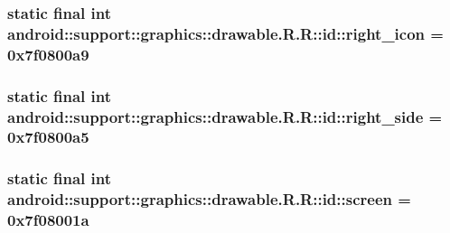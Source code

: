 \hypertarget{classandroid_1_1support_1_1graphics_1_1drawable_1_1_r_1_1id_70ab3cedc2a740c3ae09f3d630d990b9}{
\subsubsection[{right\_\-icon}]{\setlength{\rightskip}{0pt plus 5cm}static final int android::support::graphics::drawable.R.R::id::right\_\-icon = 0x7f0800a9}}
\label{classandroid_1_1support_1_1graphics_1_1drawable_1_1_r_1_1id_70ab3cedc2a740c3ae09f3d630d990b9}


\hypertarget{classandroid_1_1support_1_1graphics_1_1drawable_1_1_r_1_1id_36475d3142060d01b9d547e88a66b2ea}{
\subsubsection[{right\_\-side}]{\setlength{\rightskip}{0pt plus 5cm}static final int android::support::graphics::drawable.R.R::id::right\_\-side = 0x7f0800a5}}
\label{classandroid_1_1support_1_1graphics_1_1drawable_1_1_r_1_1id_36475d3142060d01b9d547e88a66b2ea}


\hypertarget{classandroid_1_1support_1_1graphics_1_1drawable_1_1_r_1_1id_90cb3d85b590166151c799fbe79e411c}{
\subsubsection[{screen}]{\setlength{\rightskip}{0pt plus 5cm}static final int android::support::graphics::drawable.R.R::id::screen = 0x7f08001a}}
\label{classandroid_1_1support_1_1graphics_1_1drawable_1_1_r_1_1id_90cb3d85b590166151c799fbe79e411c}


